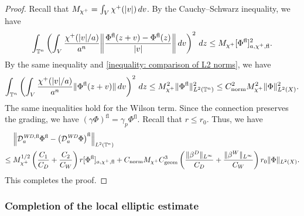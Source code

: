 \documentclass[a4paper,oneside,12pt]{amsart}
\theoremstyle{plain}
\theoremstyle{definition}
\theoremstyle{remark}
\DeclarePairedDelimiter{\abs}{\lvert}{\rvert}
\DeclarePairedDelimiter{\norm}{\lVert}{\rVert}
\DeclarePairedDelimiter{\seminorm}{\lbrack}{\rbrack}
\newcommand{\flattorus}{\mathbb{T}^n}
\newcommand{\Ltwonorm}[2][L^2]{\norm{#2}_{#1}}
\newcommand{\flatmesoscopicdifferenceseminorm}[3][a]{\seminorm{#3}_{#1,#2,\mathrm{fl}}}
\newcommand{\mesoscopicWilsonDiracoperator}[1][a]{\mathcal{D}_{#1}^{\mathit{WD}}}
\newcommand{\cutoff}{\beta}
\newcommand{\cutoffDirac}{\cutoff^D}
\newcommand{\cutoffWilson}{\cutoff^W}
\newcommand{\cutoffupper}{\chi^+}
\newcommand{\flatmesoscopicWilsonDiracoperator}[1][a]{\mathcal{D}_{#1}^{\mathit{WD},\mathrm{fl}}}
\newcommand{\flatmodel}[1]{#1^{\mathrm{fl}}}
\newcommand{\constantgeometric}{C_{\mathrm{geom}}}
\newcommand{\constantLtwonorm}{C_{\mathrm{norm}}}
\begin{document}
\begin{proof}
  Recall that $M_{\cutoffupper} = \int_V \cutoffupper(\abs{v}) \,dv$.
  By the Cauchy--Schwarz inequality, we have
  \begin{equation}
    \int_{\flattorus} \left( \int_V \frac{\cutoffupper(\abs{v}/a)}{a^n} \norm*{\frac{\flatmodel{\Phi}(z+v) - \flatmodel{\Phi}(z)}{\abs{v}}} \,dv \right)^2 \,dz \le M_{\cutoffupper} \flatmesoscopicdifferenceseminorm{\cutoffupper}{\flatmodel{\Phi}}^2.
  \end{equation}
  By the same inequality and \eqref{inequality: comparison of L2 norms}, we have
  \begin{equation}
    \int_{\flattorus} \left( \int_V \frac{\cutoffupper(\abs{v}/a)}{a^n} \norm{\flatmodel{\Phi}(z+v)} \,dv \right)^2 \,dz \le M_{\cutoffupper}^2 \Ltwonorm[L^2(\flattorus)]{\flatmodel{\Phi}}^2 \le \constantLtwonorm^2 M_{\cutoffupper}^2 \Ltwonorm[L^2(X)]{\Phi}^2.
  \end{equation}
  The same inequalities hold for the Wilson term.
  Since the connection preserves the grading, we have $\flatmodel{(\gamma \Phi)} = \gamma_p \flatmodel{\Phi}$.
  Recall that $r \le r_0$.
  Thus, we have
  \begin{equation}
    \begin{aligned}
    & \norm*{\flatmesoscopicWilsonDiracoperator \flatmodel{\Phi} - \flatmodel{\left(\mesoscopicWilsonDiracoperator \Phi\right)}}_{L^2(\flattorus)} \\
    \le{}& M_{\cutoffupper}^{1/2} \left(\frac{C_1}{C_D} + \frac{C_2}{C_W}\right) r \flatmesoscopicdifferenceseminorm{\cutoffupper}{\flatmodel{\Phi}} + \constantLtwonorm M_{\cutoffupper} \constantgeometric^3 \left(\frac{\norm{\cutoffDirac}_{L^{\infty}}}{C_D}+\frac{\norm{\cutoffWilson}_{L^{\infty}}}{C_W}\right) r_0 \Ltwonorm[L^2(X)]{\Phi}.
    \end{aligned}
  \end{equation}
  This completes the proof.
\end{proof}

\subsubsection{Completion of the local elliptic estimate}
\end{document}
